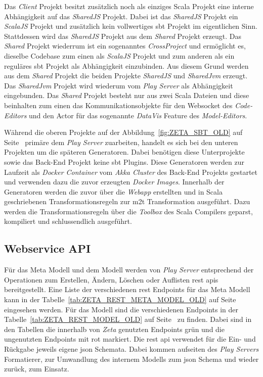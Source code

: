 Das \textit{Client} Projekt besitzt zusätzlich noch als einziges Scala Projekt eine interne Abhängigkeit auf das \textit{SharedJS} Projekt. Dabei ist das \textit{SharedJS} Projekt ein \textit{ScalaJS} Projekt und zusätzlich kein vollwertiges \ac{sbt} Projekt im eigentlichen Sinn. Stattdessen wird das \textit{SharedJS} Projekt aus dem \textit{Shared} Projekt erzeugt. Das \textit{Shared} Projekt wiederrum ist ein sogenanntes \textit{CrossProject} und ermöglicht es, dieselbe Codebase zum einen als \textit{ScalaJS} Projekt und zum anderen als ein reguläres \ac{sbt} Projekt als Abhängigkeit einzubinden. Aus diesem Grund werden aus dem \textit{Shared} Projekt die beiden Projekte \textit{SharedJS} und \textit{SharedJvm} erzeugt. Das \textit{SharedJvm} Projekt wird wiederum vom \textit{Play Server} als Abhängigkeit eingebunden. Das \textit{Shared} Projekt besteht nur aus zwei Scala Dateien und diese beinhalten zum einen das Kommunikationsobjekte für den Websocket des \textit{Code-Editors} und den Actor für das sogenannte \textit{DataVis} Feature des \textit{Model-Editors}.

Während die oberen Projekte auf der Abbildung~\ref{fig:ZETA_SBT_OLD} auf Seite~\pageref{fig:ZETA_SBT_OLD} primäre dem \textit{Play Server} zuarbeiten, handelt es sich bei den unteren Projekten um die späteren Generatoren. Dabei benötigen diese Unterprojekte sowie das Back-End Projekt keine \ac{sbt} Plugins. Diese Generatoren werden zur Laufzeit als \textit{Docker Container} vom \textit{Akka Cluster} des Back-End Projekts gestartet und verwenden dazu die zuvor erzeugten \textit{Docker Images}. Innerhalb der Generatoren werden die zuvor über die \textit{Webapp} erstellten und in Scala geschriebenen Transformationsregeln zur \ac{m2t} Transformation ausgeführt. Dazu werden die Transformationsregeln über die \textit{Toolbox} des Scala Compilers geparst, kompiliert und schlussendlich ausgeführt.

\subsection{Webservice API}

Für das Meta Modell und dem Modell werden von \textit{Play Server} entsprechend der Operationen zum Erstellen, Ändern, Löschen oder Auflisten \ac{rest} \acp{api} bereitgestellt. Eine Liste der verschiedenen \ac{rest} Endpoints für das Meta Modell kann in der Tabelle~\ref{tab:ZETA_REST_META_MODEL_OLD} auf Seite~\pageref{tab:ZETA_REST_META_MODEL_OLD} eingesehen werden. Für das Modell sind die verschiedenen Endpoints in der Tabelle~\ref{tab:ZETA_REST_MODEL_OLD} auf Seite~\pageref{tab:ZETA_REST_MODEL_OLD} zu finden. Dabei sind in den Tabellen die innerhalb von \textit{Zeta} genutzten Endpoints grün und die ungenutzten Endpoints mit rot markiert. Die \ac{rest} \ac{api} verwendet für die Ein- und Rückgabe jeweils eigene \ac{json} Schemata. Dabei kommen aufseiten des \textit{Play Servers} Formatierer, zur Umwandlung des internem Modells zum \ac{json} Schema und wieder zurück, zum Einsatz.

